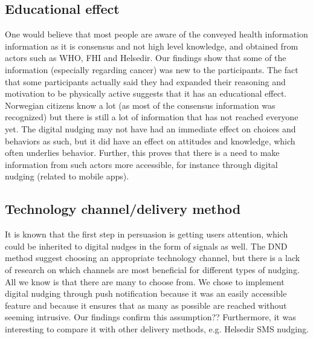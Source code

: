 \subsection{Educational effect}
One would believe that most people are aware of the conveyed health information information as it is consensus and not high level knowledge, and obtained from actors such as WHO, FHI and Helsedir. Our findings show that some of the information (especially regarding cancer) was new to the participants. The fact that some participants actually said they had expanded their reasoning and motivation to be physically active suggests that it has an educational effect. Norwegian citizens know a lot (as most of the consensus information was recognized) but there is still a lot of information that has not reached everyone yet. The digital nudging may not have had an immediate effect on choices and behaviors as such, but it did have an effect on attitudes and knowledge, which often underlies behavior. Further, this proves that there is a need to make information from such actors more accessible, for instance through digital nudging (related to mobile apps). 

\subsection{Technology channel/delivery method}
It is known that the first step in persuasion is getting users attention, which could be inherited to digital nudges in the form of signals as well. The DND method suggest choosing an appropriate technology channel, but there is a lack of research on which channels are most beneficial for different types of nudging.  All we know is that there are many to choose from. We chose to implement digital nudging through push notification because it was an easily accessible feature and because it ensures that as many as possible are reached without seeming intrusive. Our findings confirm this assumption?? Furthermore, it was interesting to compare it with other delivery methods, e.g. Helsedir SMS nudging. 

